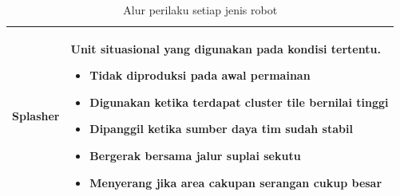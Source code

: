 \documentclass{article}
\begin{document}
\begin{table}[H]
\begin{tabular}{|p{3cm}|p{11cm}|}
Splasher &
Unit situasional yang digunakan pada kondisi tertentu.
\begin{itemize}[leftmargin=*, nosep]
\item Tidak diproduksi pada awal permainan
\item Digunakan ketika terdapat cluster tile bernilai tinggi
\item Dipanggil ketika sumber daya tim sudah stabil
\item Bergerak bersama jalur suplai sekutu
\item Menyerang jika area cakupan serangan cukup besar
\end{itemize}
\\
\hline

\end{tabular}
\caption{Alur perilaku setiap jenis robot}
\end{table}
\end{document}

